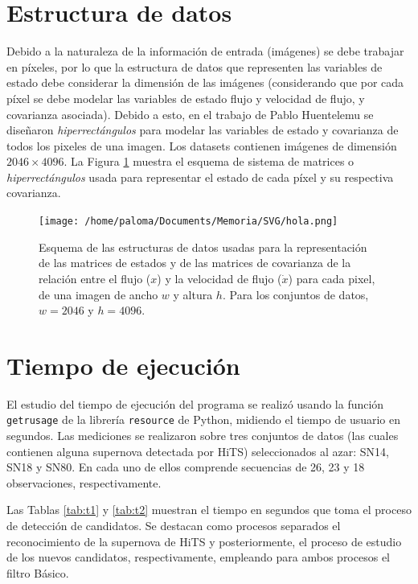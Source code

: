 \section{Estructura de datos}
\label{des:struct}
Debido a la naturaleza de la informaci\'on de entrada (im\'agenes) se debe trabajar en p\'ixeles, por lo que la estructura de datos que representen las variables de estado debe considerar la dimensi\'on de las im\'agenes (considerando que por cada p\'ixel se debe modelar las variables de estado flujo y velocidad de flujo, y covarianza asociada). Debido a esto, en el trabajo de Pablo Huentelemu \cite{huentelemu} se dise\~naron \textit{hiperrect\'angulos} para modelar las variables de estado y covarianza de todos los pixeles de una imagen. Los datasets contienen im\'agenes de dimensi\'on  $2046 \times 4096$. La Figura \ref{fig:data_scheme} muestra el esquema de sistema de matrices o \textit{hiperrect\'angulos} usada para representar el estado de cada p\'ixel y su respectiva covarianza.
\bigskip  

\begin{figure}
\centering
\texttt{[image: /home/paloma/Documents/Memoria/SVG/hola.png]}
\caption{Esquema de las estructuras de datos usadas para la representaci\'on de las matrices de estados y de las matrices de covarianza de la relaci\'on entre el flujo ($x$) y la velocidad de flujo ($\dot{x}$) para cada pixel, de una imagen de ancho $w$ y altura $h$. Para los conjuntos de datos, $w=2046$ y $h=4096$.}
\label{fig:data_scheme}
\end{figure}
\bigskip

\section{Tiempo de ejecuci\'on}

El estudio del tiempo de ejecuci\'on del programa se realiz\'o usando la funci\'on \texttt{getrusage} de la librer\'ia \texttt{resource} de Python, midiendo el tiempo de usuario en segundos. Las mediciones se realizaron sobre tres conjuntos de datos (las cuales contienen alguna supernova detectada por HiTS) seleccionados al azar: SN14, SN18 y  SN80. En cada uno de ellos comprende secuencias de 26, 23 y 18 observaciones, respectivamente. 
\bigskip

Las Tablas \ref{tab:t1} y \ref{tab:t2} muestran el tiempo en segundos que toma el proceso de detecci\'on de candidatos. Se destacan como procesos separados el reconocimiento de la supernova de HiTS y posteriormente, el proceso de estudio de los nuevos candidatos, respectivamente, empleando para ambos procesos el filtro B\'asico.  


